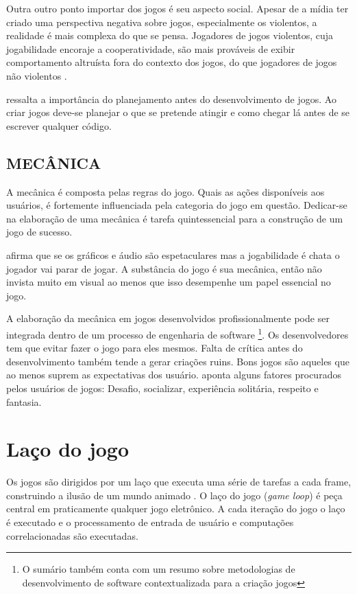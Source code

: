 Outra outro ponto importar dos jogos é seu aspecto social. Apesar de a
mídia ter criado uma perspectiva negativa sobre jogos, especialmente
os violentos, a realidade é mais complexa do que se pensa. Jogadores
de jogos violentos, cuja jogabilidade encoraje a cooperatividade, são
mais prováveis de exibir comportamento altruísta fora do contexto dos
jogos, do que jogadores de jogos não violentos \autocite{gamebenefits}.

\cite{html5mostwanted} ressalta a importância do planejamento antes do
desenvolvimento de jogos. Ao criar jogos deve-se planejar o que se
pretende atingir e como chegar lá antes de se escrever qualquer
código.

\subsection{MECÂNICA}

A mecânica é composta pelas regras do jogo. Quais as ações
disponíveis aos usuários, é fortemente influenciada pela categoria do
jogo em questão. Dedicar-se na elaboração de uma mecânica é tarefa
quintessencial para a construção de um jogo de sucesso.

\autocite{html5mostwanted} afirma que se os gráficos e áudio são
espetaculares mas a jogabilidade é chata o jogador vai parar de jogar.
A substância do jogo é sua mecânica, então não invista muito em
visual ao menos que isso desempenhe um papel essencial no jogo.

A elaboração da mecânica em jogos desenvolvidos profissionalmente
pode ser integrada dentro de um processo de engenharia de software
\footnote{O sumário também conta com um resumo sobre metodologias de
desenvolvimento de software contextualizada para a criação jogos}.
Os desenvolvedores tem que evitar fazer o jogo para eles mesmos.
Falta de crítica  antes do desenvolvimento também tende a gerar criações ruins.
Bons jogos são aqueles que ao menos  suprem as expectativas dos usuário.
\cite{indieGamesLemes} aponta alguns fatores procurados pelos usuários
de jogos: Desafio, socializar, experiência solitária, respeito e
fantasia.

\section{Laço do jogo}

Os jogos são dirigidos por um laço que executa uma série de tarefas
a cada frame, construindo a ilusão de um mundo animado \autocite[pp.
31]{gwt}. O laço do jogo (\textit{game loop}) é peça central em
praticamente qualquer jogo eletrônico. A cada iteração do jogo
o laço é executado e o processamento de entrada de usuário e
computações correlacionadas são executadas.

